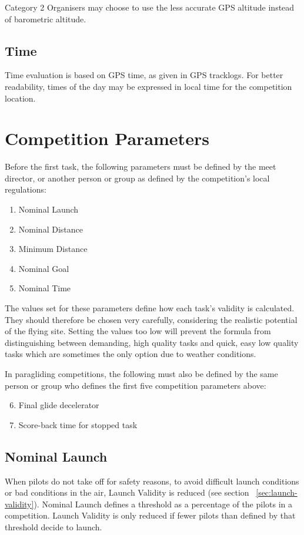 \documentclass{article}
\begin{document}
Category 2 Organisers may choose to use the less accurate GPS altitude instead
of barometric altitude.

\subsection{Time}
Time evaluation is based on GPS time, as given in GPS tracklogs. For better
readability, times of the day may be expressed in local time for the
competition location.

\newpage
\section{Competition Parameters}
Before the first task, the following parameters must be defined by the meet
director, or another person or group as defined by the competition’s local
regulations:
\begin{enumerate}
    \item Nominal Launch
    \item Nominal Distance
    \item Minimum Distance
    \item Nominal Goal
    \item Nominal Time
\end{enumerate}
The values set for these parameters define how each task’s validity is
calculated. They should therefore be chosen very carefully, considering the
realistic potential of the flying site. Setting the values too low will prevent
the formula from distinguishing between demanding, high quality tasks and
quick, easy low quality tasks which are sometimes the only option due to
weather conditions.

\begin{pg}
In paragliding competitions, the following must also be defined by the same
person or group who defines the first five competition parameters above:
\begin{enumerate}
    \setcounter{enumi}{5}
    \item Final glide decelerator
    \item Score-back time for stopped task
\end{enumerate}
\end{pg}

\subsection{Nominal Launch}
\label{sec:nominal-launch}
When pilots do not take off for safety reasons, to avoid difficult launch
conditions or bad conditions in the air, Launch Validity is reduced (see
section ~\ref{sec:launch-validity}). Nominal Launch defines a threshold as a percentage of the pilots
in a competition. Launch Validity is only reduced if fewer pilots than defined
by that threshold decide to launch.
\end{document}
